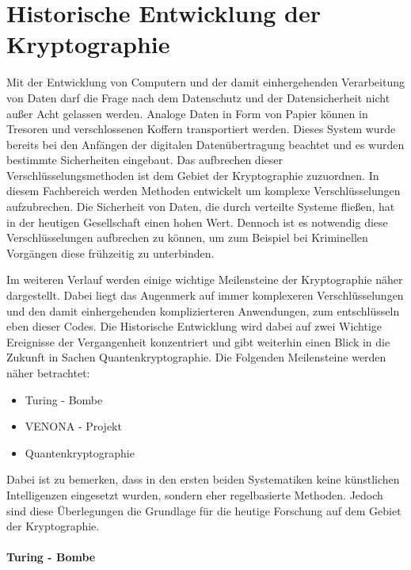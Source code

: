 \chapter{Historische Entwicklung der Kryptographie}

Mit der Entwicklung von Computern und der damit einhergehenden Verarbeitung von Daten darf die Frage nach dem Datenschutz und der Datensicherheit nicht außer Acht gelassen werden. Analoge Daten in Form von Papier können in Tresoren und verschlossenen Koffern transportiert werden. Dieses System wurde bereits bei den Anfängen der digitalen Datenübertragung beachtet und es wurden bestimmte Sicherheiten eingebaut.
Das aufbrechen dieser Verschlüsselungsmethoden ist dem Gebiet der Kryptographie zuzuordnen. In diesem Fachbereich werden Methoden entwickelt um komplexe Verschlüsselungen aufzubrechen.
Die Sicherheit von Daten, die durch verteilte Systeme fließen, hat in der heutigen Gesellschaft einen hohen Wert. Dennoch ist es notwendig diese Verschlüsselungen aufbrechen zu können, um zum Beispiel bei Kriminellen Vorgängen diese frühzeitig zu unterbinden.

Im weiteren Verlauf werden einige wichtige Meilensteine der Kryptographie näher dargestellt. Dabei liegt das Augenmerk auf immer komplexeren Verschlüsselungen und den damit einhergehenden komplizierteren Anwendungen, zum entschlüsseln eben dieser Codes. Die Historische Entwicklung wird dabei auf zwei Wichtige Ereignisse der Vergangenheit konzentriert und gibt weiterhin einen Blick in die Zukunft in Sachen Quantenkryptographie. Die Folgenden Meilensteine werden näher betrachtet:
\begin{itemize}
	\item Turing - Bombe
	\item VENONA - Projekt
	\item Quantenkryptographie
\end{itemize}

Dabei ist zu bemerken, dass in den ersten beiden Systematiken keine künstlichen Intelligenzen eingesetzt wurden, sondern eher regelbasierte Methoden. Jedoch sind diese Überlegungen die Grundlage für die heutige Forschung auf dem Gebiet der Kryptographie.

\subsubsection{Turing - Bombe}

